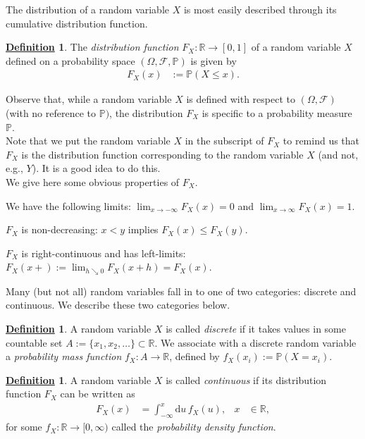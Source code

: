 \documentclass[12pt]{book}
\numberwithin{equation}{chapter}
\theoremstyle{plain}
\numberwithin{theorem}{section}
\theoremstyle{definition}
\newtheorem{definition}[theorem]{\underline{Definition}}
\numberwithin{exercise}{chapter}
\newcommand{\<}{\langle}
\renewcommand{\>}{\rangle}
\renewcommand{\(}{\left(}
\renewcommand{\)}{\right)}
\renewcommand{\[}{\left[}
\renewcommand{\]}{\right]}
\newcommand\Pb{\mathds{P}}
\newcommand\Rb{\mathds{R}}
\newcommand\Fc{\mathscr{F}}
\newcommand\Om{\Omega}
\newcommand\dd{\mathrm{d}}
\begin{document}
\noindent
The distribution of a random variable $X$ is most easily described through its cumulative distribution function.

\begin{definition}
The \emph{distribution function} $F_X: \Rb \to [0,1]$ of a random variable $X$ defined on a probability space $(\Om,\Fc,\Pb)$ is given by
\begin{align}
F_X(x)
	&:=	\Pb( X \leq x ) .
\end{align}
\end{definition}

\noindent
Observe that, while a random variable $X$ is defined with respect to $(\Om,\Fc)$ (with no reference to $\Pb)$, the distribution $F_X$ is specific to a probability measure $\Pb$.
\\[0.5em]
Note that we put the random variable $X$ in the subscript of $F_X$ to remind us that $F_X$ is the distribution function corresponding to the random variable $X$ (and not, e.g., $Y$).  It is a good idea to do this.
\\[0.5em]
We give here some obvious properties of $F_X$.
\begin{enumerate*}
\item We have the following limits: $\lim_{x \to - \infty} F_X(x) = 0$ and $\lim_{x \to \infty} F_X(x) = 1$.
\item $F_X$ is non-decreasing: $x < y$ implies $F_X(x) \leq F_X(y)$.
\item $F_X$ is right-continuous and has left-limits: $F_X(x+) := \lim_{h \searrow 0} F_X(x+h) = F_X(x)$.
\end{enumerate*}

\noindent
Many (but not all) random variables fall in to  one of two categories: discrete and continuous.  We describe these two categories below.

\begin{definition}
A random variable $X$ is called \emph{discrete} if it takes values in some countable set $A := \{ x_1, x_2,\ldots \} \subset \Rb$.  We associate with  a discrete random variable a \emph{probability mass function} $f_X : A \to \Rb$, defined by $f_X(x_i) := \Pb( X = x_i )$. 
\end{definition}

\begin{definition}
A random variable $X$ is called \emph{continuous} if its distribution function $F_X$ can be written as
\begin{align}
F_X(x)
	&=	\int_{-\infty}^x \dd u \, f_X(u) , &
x
	&\in \Rb ,
\end{align}
for some $f_X : \Rb \to [0,\infty)$ called the \emph{probability density function}.
\end{definition}
\end{document}
